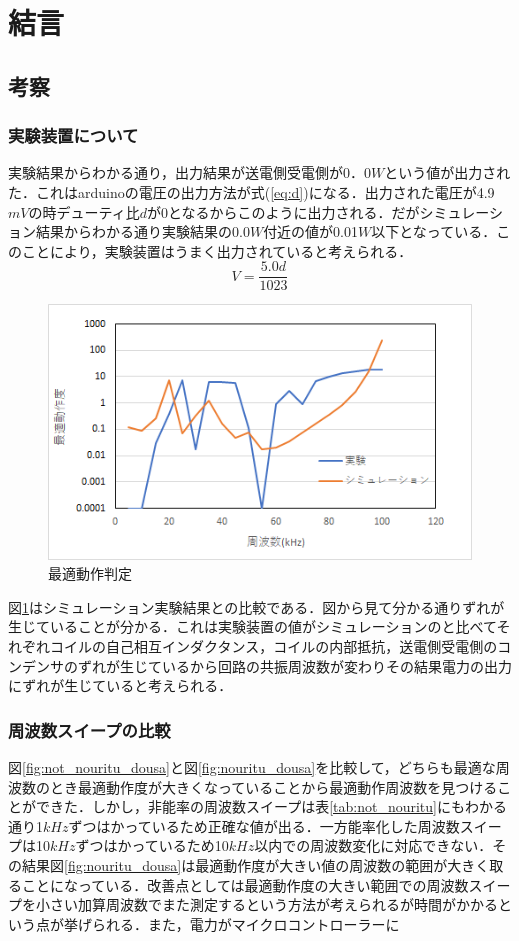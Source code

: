 \documentclass[12pt]{jarticle}
\begin{document}
\section{結言}
\subsection{考察}
\subsubsection{実験装置について}
実験結果からわかる通り，出力結果が送電側受電側が0．0$W$という値が出力された．これはarduinoの電圧の出力方法が式(\ref{eq:d})になる．出力された電圧が4.9$mV$の時デューティ比$d$が0となるからこのように出力される．だがシミュレーション結果からわかる通り実験結果の0.0$W$付近の値が0.01$W$以下となっている．このことにより，実験装置はうまく出力されていると考えられる．
\begin{equation}
\label{eq:d}
V=\frac{5.0d}{1023}
\end{equation}
\begin{figure}[H]
	\centering
	\includegraphics[]{simuhikaku.png}
	\caption{最適動作判定}
	\label{fig:simuhikaku}
\end{figure}
図\ref{fig:simuhikaku}はシミュレーション実験結果との比較である．図から見て分かる通りずれが生じていることが分かる．これは実験装置の値がシミュレーションのと比べてそれぞれコイルの自己相互インダクタンス，コイルの内部抵抗，送電側受電側のコンデンサのずれが生じているから回路の共振周波数が変わりその結果電力の出力にずれが生じていると考えられる．
\subsubsection{周波数スイープの比較}
図\ref{fig:not_nouritu_dousa}と図\ref{fig:nouritu_dousa}を比較して，どちらも最適な周波数のとき最適動作度が大きくなっていることから最適動作周波数を見つけることができた．しかし，非能率の周波数スイープは表\ref{tab:not_nouritu}にもわかる通り1$kHz$ずつはかっているため正確な値が出る．一方能率化した周波数スイープは10$kHz$ずつはかっているため10$kHz$以内での周波数変化に対応できない．その結果図\ref{fig:nouritu_dousa}は最適動作度が大きい値の周波数の範囲が大きく取ることになっている．改善点としては最適動作度の大きい範囲での周波数スイープを小さい加算周波数でまた測定するという方法が考えられるが時間がかかるという点が挙げられる．また，電力がマイクロコントローラーに
\end{document}
